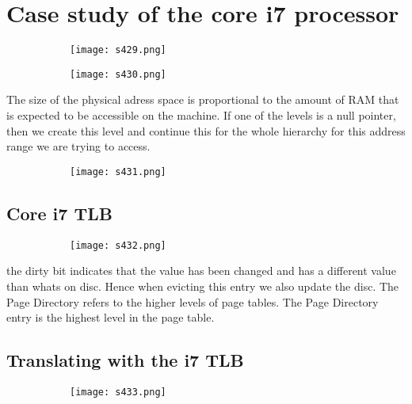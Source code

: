 \documentclass[8pt]{extreport}
\begin{document}
\section{Case study of the core i7 processor}
\begin{figure}[H]
\begin{subfigure}[b]{0.4\linewidth}
\texttt{[image: s429.png]}
\end{subfigure}
\begin{subfigure}[b]{0.4\linewidth}
\texttt{[image: s430.png]}
\end{subfigure}
\end{figure}
The size of the physical adress space is proportional to the amount of RAM that is expected to be accessible on the machine. If one of the levels is a null pointer, then we create this level and continue this for the whole hierarchy for this address range we are trying to access.
\begin{figure}[H]
\begin{subfigure}[b]{0.4\linewidth}
\texttt{[image: s431.png]}
\end{subfigure}
\end{figure}

\subsection{Core i7 TLB}
\begin{figure}[H]
\begin{subfigure}[b]{0.4\linewidth}
\texttt{[image: s432.png]}
\end{subfigure}
\end{figure}
the dirty bit indicates that the value has been changed and has a different value than whats on disc. Hence when evicting this entry we also update the disc. The Page Directory refers to the higher levels of page tables. The Page Directory entry is the highest level in the page table.

\subsection{Translating with the i7 TLB}
\begin{figure}[H]
\begin{subfigure}[b]{0.4\linewidth}
\texttt{[image: s433.png]}
\end{subfigure}
\end{figure}
\end{document}
